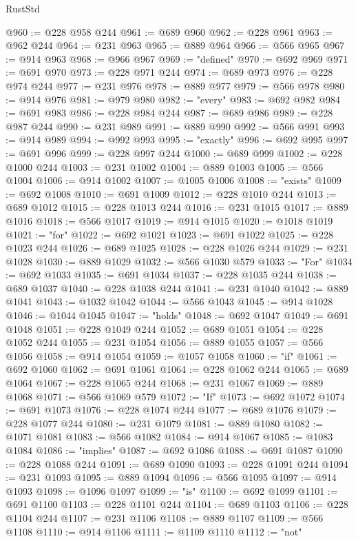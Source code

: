 \begin{lexlean}{RustStd}
\begin{coremodule}
@960 := @228 @958 @244
@961 := @689 @960
@962 := @228 @961
@963 := @962 @244
@964 := @231 @963
@965 := @889 @964
@966 := @566 @965
@967 := @914 @963
@968 := @966 @967
@969 := "defined"
@970 := @692 @969
@971 := @691 @970
@973 := @228 @971 @244
@974 := @689 @973
@976 := @228 @974 @244
@977 := @231 @976
@978 := @889 @977
@979 := @566 @978
@980 := @914 @976
@981 := @979 @980
@982 := "every"
@983 := @692 @982
@984 := @691 @983
@986 := @228 @984 @244
@987 := @689 @986
@989 := @228 @987 @244
@990 := @231 @989
@991 := @889 @990
@992 := @566 @991
@993 := @914 @989
@994 := @992 @993
@995 := "exactly"
@996 := @692 @995
@997 := @691 @996
@999 := @228 @997 @244
@1000 := @689 @999
@1002 := @228 @1000 @244
@1003 := @231 @1002
@1004 := @889 @1003
@1005 := @566 @1004
@1006 := @914 @1002
@1007 := @1005 @1006
@1008 := "exists"
@1009 := @692 @1008
@1010 := @691 @1009
@1012 := @228 @1010 @244
@1013 := @689 @1012
@1015 := @228 @1013 @244
@1016 := @231 @1015
@1017 := @889 @1016
@1018 := @566 @1017
@1019 := @914 @1015
@1020 := @1018 @1019
@1021 := "for"
@1022 := @692 @1021
@1023 := @691 @1022
@1025 := @228 @1023 @244
@1026 := @689 @1025
@1028 := @228 @1026 @244
@1029 := @231 @1028
@1030 := @889 @1029
@1032 := @566 @1030 @579
@1033 := "For"
@1034 := @692 @1033
@1035 := @691 @1034
@1037 := @228 @1035 @244
@1038 := @689 @1037
@1040 := @228 @1038 @244
@1041 := @231 @1040
@1042 := @889 @1041
@1043 := @1032 @1042
@1044 := @566 @1043
@1045 := @914 @1028
@1046 := @1044 @1045
@1047 := "holds"
@1048 := @692 @1047
@1049 := @691 @1048
@1051 := @228 @1049 @244
@1052 := @689 @1051
@1054 := @228 @1052 @244
@1055 := @231 @1054
@1056 := @889 @1055
@1057 := @566 @1056
@1058 := @914 @1054
@1059 := @1057 @1058
@1060 := "if"
@1061 := @692 @1060
@1062 := @691 @1061
@1064 := @228 @1062 @244
@1065 := @689 @1064
@1067 := @228 @1065 @244
@1068 := @231 @1067
@1069 := @889 @1068
@1071 := @566 @1069 @579
@1072 := "If"
@1073 := @692 @1072
@1074 := @691 @1073
@1076 := @228 @1074 @244
@1077 := @689 @1076
@1079 := @228 @1077 @244
@1080 := @231 @1079
@1081 := @889 @1080
@1082 := @1071 @1081
@1083 := @566 @1082
@1084 := @914 @1067
@1085 := @1083 @1084
@1086 := "implies"
@1087 := @692 @1086
@1088 := @691 @1087
@1090 := @228 @1088 @244
@1091 := @689 @1090
@1093 := @228 @1091 @244
@1094 := @231 @1093
@1095 := @889 @1094
@1096 := @566 @1095
@1097 := @914 @1093
@1098 := @1096 @1097
@1099 := "is"
@1100 := @692 @1099
@1101 := @691 @1100
@1103 := @228 @1101 @244
@1104 := @689 @1103
@1106 := @228 @1104 @244
@1107 := @231 @1106
@1108 := @889 @1107
@1109 := @566 @1108
@1110 := @914 @1106
@1111 := @1109 @1110
@1112 := "not"

\end{coremodule}
\end{lexlean}
